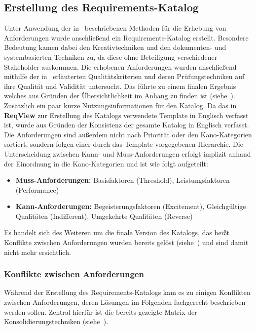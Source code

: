 \subsection{Erstellung des Requirements-Katalog}\label{subsec:requirements}
Unter Anwendung der in~ beschriebenen Methoden für die Erhebung von Anforderungen
wurde anschließend ein Requirements-Katalog erstellt.
Besondere Bedeutung kamen dabei den Kreativtechniken und den dokumenten- und systembasierten Techniken zu, da diese ohne
Beteiligung verschiedener Stakeholder auskommen.
Die erhobenen Anforderungen wurden anschließend mithilfe der in~
erläuterten Qualitätskriterien und deren Prüfungstechniken auf ihre Qualität und Validität untersucht.
Das führte zu einem finalen Ergebnis welches aus Gründen der Übersichtlichkeit im Anhang zu finden ist
(siehe~).
Zusätzlich ein paar kurze Nutzungsinformationen für den Katalog.
Da das in \textbf{ReqView} zur Erstellung des Katalogs verwendete Template in Englisch verfasst ist, wurde aus Gründen
der Konsistenz der gesamte Katalog in Englisch verfasst.
Die Anforderungen sind außerdem nicht nach Priorität oder den Kano-Kategorien sortiert, sondern folgen einer durch das
Template vorgegebenen Hierarchie.
Die Unterscheidung zwischen Kann- und Muss-Anforderungen erfolgt implizit anhand der Einordnung in die Kano-Kategorien und
ist wie folgt aufgeteilt:
\begin{itemize}
    \item \textbf{Muss-Anforderungen:} Basisfaktoren (Threshold), Leistungsfaktoren (Performance)
    \item \textbf{Kann-Anforderungen:} Begeisterungsfaktoren (Excitement), Gleichgültige Qualitäten (Indifferent),
    Umgekehrte Qualitäten (Reverse)
\end{itemize}

Es handelt sich des Weiteren um die finale Version des Katalogs, das heißt Konflikte zwischen Anforderungen wurden bereits
gelöst (siehe~) und sind damit nicht mehr ersichtlich.

\subsubsection{Konflikte zwischen Anforderungen}\label{subsubsec:conflicts}
Während der Erstellung des Requirements-Katalogs kam es zu einigen Konflikten zwischen Anforderungen, deren Lösungen im Folgenden
fachgerecht beschrieben werden sollen.
Zentral hierfür ist die bereits gezeigte Matrix der Konsolidierungstechniken (siehe~).

